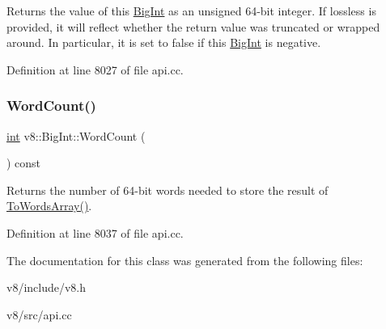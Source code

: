Returns the value of this \mbox{\hyperlink{classv8_1_1BigInt}{Big\+Int}} as an unsigned 64-\/bit integer. If {\ttfamily lossless} is provided, it will reflect whether the return value was truncated or wrapped around. In particular, it is set to {\ttfamily false} if this \mbox{\hyperlink{classv8_1_1BigInt}{Big\+Int}} is negative. 

Definition at line 8027 of file api.\+cc.

\mbox{\label{classv8_1_1BigInt_a840783db8ae94178040c5a8a7bb52875}} 
\subsubsection{\texorpdfstring{Word\+Count()}{WordCount()}}
{\footnotesize\ttfamily \mbox{\hyperlink{classint}{int}} v8\+::\+Big\+Int\+::\+Word\+Count (\begin{DoxyParamCaption}{ }\end{DoxyParamCaption}) const}

Returns the number of 64-\/bit words needed to store the result of \mbox{\hyperlink{classv8_1_1BigInt_adbc582fd6ae26b6afe9b5591b5fe06e7}{To\+Words\+Array()}}. 

Definition at line 8037 of file api.\+cc.



The documentation for this class was generated from the following files\+:\begin{DoxyCompactItemize}
\item 
v8/include/v8.\+h\item 
v8/src/api.\+cc\end{DoxyCompactItemize}
